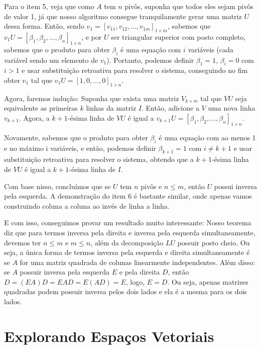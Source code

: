 \documentclass[11pt, a4paper]{article}
\begin{document}
Para o item 5, veja que como \(A\) tem \(n\) pivôs, suponha que todos eles sejam pivôs de valor 1, já que nosso algoritmo consegue tranquilamente gerar uma matriz \(U\) dessa forma. Então, sendo \(v_1=[v_{11},v_{12},...,v_{1m}]_{1\times m}\), sabemos que \(v_1U=[\beta_1,\beta_2,...,\beta_n]_{1\times n}\), e por \(U\) ser triangular superior com posto completo, sabemos que o produto para obter \(\beta_i\) é uma equação com \(i\) variáveis (cada variável sendo um elemento de \(v_1\)). Portanto, podemos definir \(\beta_1=1\), \(\beta_i=0\) com \(i>1\) e usar substituição retroativa para resolver o sistema, conseguindo no fim obter \(v_1\) tal que \(v_1U=[1,0,...,0]_{1\times n}\).

Agora, faremos indução: Suponha que exista uma matriz \(V_{k\times m}\) tal que \(VU\) seja equivalente as primeiras \(k\) linhas da matriz \(I\). Então, adicione a \(V\) uma nova linha \(v_{k+1}\). Agora, a \(k+1\)-ésima linha de \(VU\) é igual a \(v_{k+1}U=[\beta_1,\beta_2,...,\beta_n]_{1\times n}\). 

Novamente, sabemos que o produto para obter \(\beta_i\) é uma equação com ao menos 1 e no máximo i variáveis, e então, podemos definir \(\beta_{k+1}=1\) com \(i\ne k+1\) e usar substituição retroativa para resolver o sistema, obtendo que a \(k+1\)-ésima linha de \(VU\) é igual a \(k+1\)-ésima linha de \(I\). 

Com base nisso, concluímos que se \(U\) tem \(n\) pivôs e \(n \leq m\), então \(U\) possui inversa pela esquerda. A demonstração do item 6 é bastante similar, onde apenas vamos construindo coluna a coluna ao invés de linha a linha.

\void[0.5]

E com isso, conseguimos provar um resultado muito interessante: Nosso teorema diz que para termos inversa pela direita e inversa pela esquerda simultaneamente, devemos ter \(n\leq m\) e \(m \leq n\), além da decomposição \(LU\) possuir posto cheio. Ou seja, a única forma de termos inversa pela esquerda e direita simultaneamente é se \(A\) for uma matriz quadrada de colunas linearmente independentes. Além disso: se \(A\) possuir inversa pela esquerda \(E\) e pela direita \(D\), então \(D=(EA)D=EAD=E(AD)=E\), logo, \(E=D\). Ou seja, apenas matrizes quadradas podem possuir inversa pelos dois lados e ela é a mesma para os dois lados.

\newpage

\section{Explorando Espaços Vetoriais}
\end{document}
